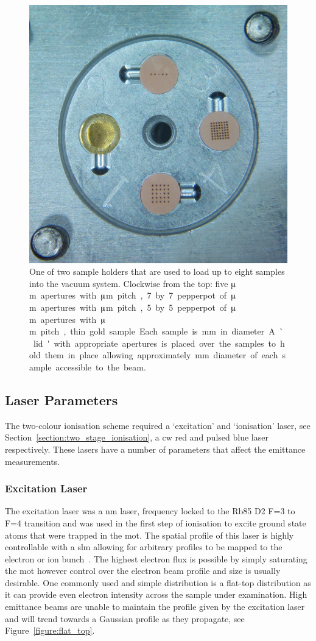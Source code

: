 \begin{figure}
    \center
    \includegraphics[width=0.49\linewidth]{part2/Figs/sample_holder.jpg}
    \caption[Sample holder.]{One of two sample holders that are used to load up to eight samples into the vacuum system. Clockwise from the top: five \unit[50]{$\muup$m} apertures with \unit[300]{$\muup$m} pitch, 7 by 7 pepperpot of \unit[50]{$\muup$m} apertures with \unit[200]{$\muup$m} pitch, 5 by 5 pepperpot of \unit[50]{$\muup$m} apertures with \unit[300]{$\muup$m} pitch, thin gold sample. Each sample is \unit[3]{mm} in diameter. A `lid' with appropriate apertures is placed over the samples to hold them in place allowing approximately \unit[2]{mm} diameter of each sample accessible to the beam.}
    \label{figure:sample_holder_pepperpots}
\end{figure}

\subsection{Laser Parameters}
The two-colour ionisation scheme required a `excitation' and `ionisation' laser, see Section~\ref{section:two_stage_ionisation}, a \gls{cw} red and pulsed blue laser respectively.
These lasers have a number of parameters that affect the emittance measurements.

\subsubsection{Excitation Laser}
The excitation laser was a \unit[780]{nm} laser, frequency locked to the Rb85 D2 F=3 to F=4 transition and was used in the first step of ionisation to excite ground state atoms that were trapped in the \gls{mot}.
The spatial profile of this laser is highly controllable with a \gls{slm} allowing for arbitrary profiles to be mapped to the electron or ion bunch~\cite{mcculloch_arbitrarily_2011}.
The highest electron flux is possible by simply saturating the \gls{mot} however control over the electron beam profile and size is usually desirable.
One commonly used and simple distribution is a flat-top distribution as it can provide even electron intensity across the sample under examination.
High emittance beams are unable to maintain the profile given by the excitation laser and will trend towards a Gaussian profile as they propagate, see Figure~\ref{figure:flat_top}.

